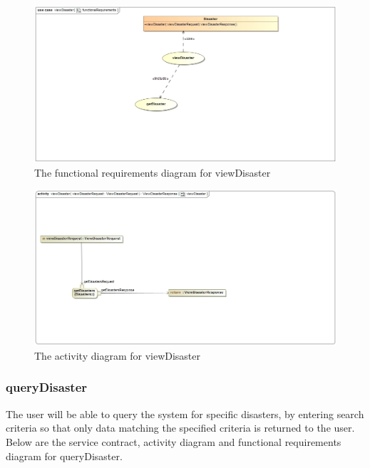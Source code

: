 \begin{figure}[H]
	\centering
	\includegraphics[width=1.0\textwidth]{../images/viewDisasterFunctionalRequirements.jpg}
	\caption{The functional requirements diagram for viewDisaster \label{overflow}}
\end{figure}

\begin{figure}[H]
	\centering
	\includegraphics[width=1.0\textwidth]{../images/viewDisasterActivityDiagram.jpg}
	\caption{The activity diagram for viewDisaster \label{overflow}}
\end{figure}

\subsubsection{queryDisaster}

The user will be able to query the system for specific disasters, by entering search criteria so that only data matching the specified criteria is returned to the user. Below are the service contract, activity diagram and functional requirements diagram for queryDisaster.

